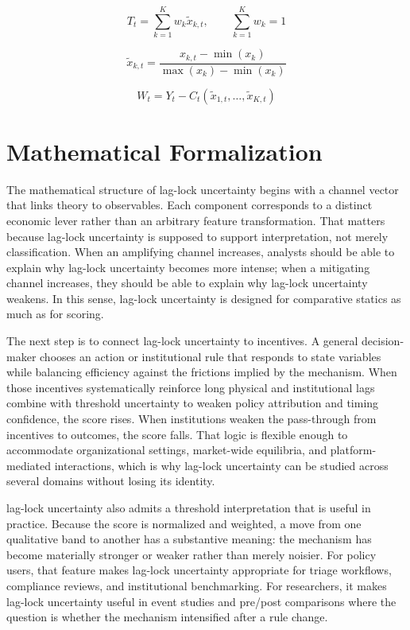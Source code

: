 \documentclass[12pt]{article}
\begin{document}
\begin{equation}
T_t = \sum_{k=1}^K w_k \tilde{x}_{k,t}, \qquad \sum_{k=1}^K w_k = 1
\label{eq:index}
\end{equation}

\begin{equation}
\tilde{x}_{k,t} = \frac{x_{k,t} - \min(x_k)}{\max(x_k) - \min(x_k)}
\label{eq:norm}
\end{equation}

\begin{equation}
W_t = Y_t - C_t(\tilde{x}_{1,t}, \dots, \tilde{x}_{K,t})
\label{eq:welfare}
\end{equation}

\section{Mathematical Formalization}
The mathematical structure of lag-lock uncertainty begins with a channel vector that links theory to observables. Each component corresponds to a distinct economic lever rather than an arbitrary feature transformation. That matters because lag-lock uncertainty is supposed to support interpretation, not merely classification. When an amplifying channel increases, analysts should be able to explain why lag-lock uncertainty becomes more intense; when a mitigating channel increases, they should be able to explain why lag-lock uncertainty weakens. In this sense, lag-lock uncertainty is designed for comparative statics as much as for scoring.

The next step is to connect lag-lock uncertainty to incentives. A general decision-maker chooses an action or institutional rule that responds to state variables while balancing efficiency against the frictions implied by the mechanism. When those incentives systematically reinforce long physical and institutional lags combine with threshold uncertainty to weaken policy attribution and timing confidence, the score rises. When institutions weaken the pass-through from incentives to outcomes, the score falls. That logic is flexible enough to accommodate organizational settings, market-wide equilibria, and platform-mediated interactions, which is why lag-lock uncertainty can be studied across several domains without losing its identity.

lag-lock uncertainty also admits a threshold interpretation that is useful in practice. Because the score is normalized and weighted, a move from one qualitative band to another has a substantive meaning: the mechanism has become materially stronger or weaker rather than merely noisier. For policy users, that feature makes lag-lock uncertainty appropriate for triage workflows, compliance reviews, and institutional benchmarking. For researchers, it makes lag-lock uncertainty useful in event studies and pre/post comparisons where the question is whether the mechanism intensified after a rule change.
\end{document}
